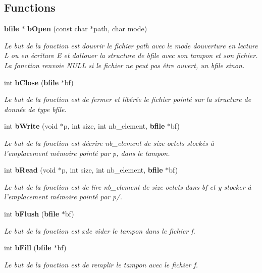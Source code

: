 \subsection*{Functions}
\begin{DoxyCompactItemize}
\item 
{\bf bfile} $\ast$ {\bf b\+Open} (const char $\ast$path, char mode)
\begin{DoxyCompactList}\small\item\em Le but de la fonction est d\textquotesingle{}ouvrir le fichier path avec le mode d\textquotesingle{}ouverture en lecture \textquotesingle{}L\textquotesingle{} ou en écriture \textquotesingle{}E\textquotesingle{} et d\textquotesingle{}allouer la structure de bfile avec son tampon et son fichier. La fonction renvoie N\+U\+LL si le fichier ne peut pas être ouvert, un bfile sinon. \end{DoxyCompactList}\item 
int {\bf b\+Close} ({\bf bfile} $\ast$bf)
\begin{DoxyCompactList}\small\item\em Le but de la fonction est de fermer et libérée le fichier pointé sur la structure de donnée de type bfile. \end{DoxyCompactList}\item 
int {\bf b\+Write} (void $\ast$p, int size, int nb\+\_\+element, {\bf bfile} $\ast$bf)
\begin{DoxyCompactList}\small\item\em Le but de la fonction est d\textquotesingle{}écrire nb\+\_\+element de size octets stockés à l’emplacement mémoire pointé par p, dans le tampon. \end{DoxyCompactList}\item 
int {\bf b\+Read} (void $\ast$p, int size, int nb\+\_\+element, {\bf bfile} $\ast$bf)
\begin{DoxyCompactList}\small\item\em Le but de la fonction est de lire nb\+\_\+element de size octets dans bf et y stocker à l’emplacement mémoire pointé par p/. \end{DoxyCompactList}\item 
int {\bf b\+Flush} ({\bf bfile} $\ast$bf)
\begin{DoxyCompactList}\small\item\em Le but de la fonction est xde vider le tampon dans le fichier f. \end{DoxyCompactList}\item 
int {\bf b\+Fill} ({\bf bfile} $\ast$bf)
\begin{DoxyCompactList}\small\item\em Le but de la fonction est de remplir le tampon avec le fichier f. \end{DoxyCompactList}\end{DoxyCompactItemize}


